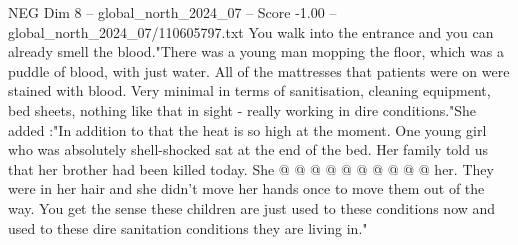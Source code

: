 \begin{textsample}{NEG Dim 8 – global\_north\_2024\_07 – Score -1.00 – global\_north\_2024\_07/110605797.txt}
You walk into the entrance and you can already smell the blood."There was a young man mopping the floor, which was a puddle of blood, with just water.
All of the mattresses that patients were on were stained with blood.
Very minimal in terms of sanitisation, cleaning equipment, bed sheets, nothing like that in sight - really working in dire conditions."She added :"In addition to that the heat is so high at the moment.
One young girl who was absolutely shell-shocked sat at the end of the bed.
Her family told us that her brother had been killed today.
She @ @ @ @ @ @ @ @ @ @ her.
They were in her hair and she didn't move her hands once to move them out of the way.
You get the sense these children are just used to these conditions now and used to these dire sanitation conditions they are living in."

\end{textsample}
